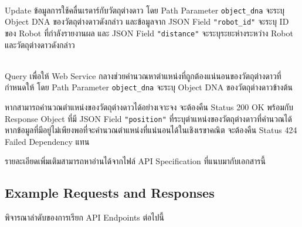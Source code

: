 \begin{description}[parsep=0.5pc]
\item[\npt{POST}{/alien/\{object\_dna\}/report}] ~ \\
    Update ข้อมูลการใช้คลื่นเรดาร์กับวัตถุต่างดาว \;
    โดย Path Parameter \lstinline{object_dna} จะระบุ Object DNA ของวัตถุต่างดาวดังกล่าว และข้อมูลจาก JSON Field \lstinline{"robot_id"} จะระบุ ID ของ Robot ที่กำลังรายงานผล และ JSON Field \lstinline{"distance"} จะระบุระยะห่างระหว่าง Robot และวัตถุต่างดาวดังกล่าว
\item[\npt{GET}{/alien/\{object\_dna\}/position}] ~ \\
    Query เพื่อให้ Web Service กลางช่วยคำนวณหาตำแหน่งที่ถูกต้องแน่นอนของวัตถุต่างดาวที่กำหนดให้ \; 
    โดย Path Parameter \lstinline{object_dna} จะระบุ Object DNA ของวัตถุต่างดาวข้างต้น

    หากสามารถคำนวณตำแหน่งของวัตถุต่างดาวได้อย่างเจาะจง จะต้องคืน Status 200 OK พร้อมกับ Response Object ที่มี JSON Field \lstinline{"position"} ที่ระบุตำแหน่งของวัตถุต่างดาวที่คำนวณได้ \;
    หากข้อมูลที่มีอยู่ไม่เพียงพอที่จะคำนวณตำแหน่งที่แน่นอนได้ในเชิงเรขาคณิต จะต้องคืน Status 424 Failed Dependency แทน
\end{description}

\noindent        
รายละเอียดเพิ่มเติมสามารถหาอ่านได้จากไฟล์ API Specification ที่แนบมากับเอกสารนี้

\subsection{Example Requests and Responses}

\noindent
พิจารณาลำดับของการเรียก API Endpoints ต่อไปนี้

